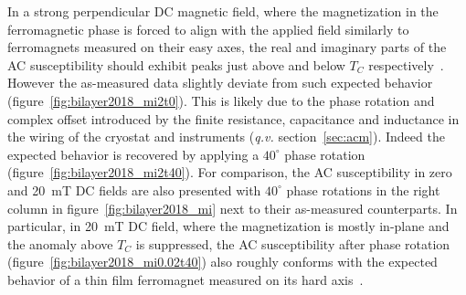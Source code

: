 In a strong perpendicular DC magnetic field, where the magnetization in the ferromagnetic phase is forced to align with the applied field similarly to ferromagnets measured on their easy axes, the real and imaginary parts of the AC susceptibility should exhibit peaks just above and below $T_C$ respectively~\cite{ac_nitroxide, Venus2004}. However the as-measured data slightly deviate from such expected behavior (figure~\ref{fig:bilayer2018_mi2t0}). This is likely due to the phase rotation and complex offset introduced by the finite resistance, capacitance and inductance in the wiring of the cryostat and instruments (\textit{q.v.} section~\ref{sec:acm}). Indeed the expected behavior is recovered by applying a $40^{\circ}$ phase rotation (figure~\ref{fig:bilayer2018_mi2t40}). For comparison, the AC susceptibility in zero and 20~mT DC fields are also presented with $40^{\circ}$ phase rotations in the right column in figure~\ref{fig:bilayer2018_mi} next to their as-measured counterparts. In particular, in 20~mT DC field, where the magnetization is mostly in-plane and the anomaly above $T_C$ is suppressed, the AC susceptibility after phase rotation (figure~\ref{fig:bilayer2018_mi0.02t40}) also roughly conforms with the expected behavior of a thin film ferromagnet measured on its hard axis~\cite{Jensen2003}.

